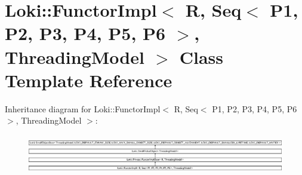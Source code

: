 \hypertarget{classLoki_1_1FunctorImpl_3_01R_00_01Seq_3_01P1_00_01P2_00_01P3_00_01P4_00_01P5_00_01P6_01_4_00_01ThreadingModel_01_4}{}\section{Loki\+:\+:Functor\+Impl$<$ R, Seq$<$ P1, P2, P3, P4, P5, P6 $>$, Threading\+Model $>$ Class Template Reference}
\label{classLoki_1_1FunctorImpl_3_01R_00_01Seq_3_01P1_00_01P2_00_01P3_00_01P4_00_01P5_00_01P6_01_4_00_01ThreadingModel_01_4}
Inheritance diagram for Loki\+:\+:Functor\+Impl$<$ R, Seq$<$ P1, P2, P3, P4, P5, P6 $>$, Threading\+Model $>$\+:\begin{figure}[H]
\begin{center}
\leavevmode
\includegraphics[height=1.751368cm]{classLoki_1_1FunctorImpl_3_01R_00_01Seq_3_01P1_00_01P2_00_01P3_00_01P4_00_01P5_00_01P6_01_4_00_01ThreadingModel_01_4}
\end{center}
\end{figure}
